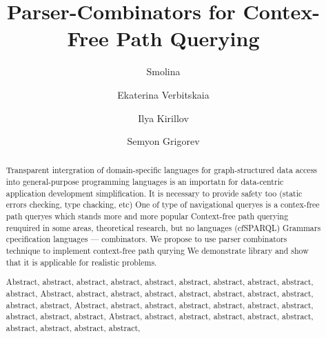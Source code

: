 \documentclass[sigconf]{acmart}
\begin{document}
\title{Parser-Combinators for Contex-Free Path Querying}


\author{Smolina}

\author{Ekaterina Verbitskaia}

\author{Ilya Kirillov}

\author{Semyon Grigorev}

\renewcommand{\shortauthors}{Smolina et al.}

\begin{abstract}
Transparent intergration of domain-specific languages for graph-structured data access into general-purpose programming languages is an importatn for data-centric application development simplification.
It is necessary to provide safety too (static errors checking, type chacking, etc)
One of type of navigational queryes is a contex-free path queryes which stands more and more popular
Context-free path querying reuquired in some areas, theoretical research, but no languages (cfSPARQL)
Grammars cpecification languages --- combinators.
We propose to use parser combinators technique to implement context-free path qurying 
We demonstrate library and show that it is applicable for realistic problems.


Abstract, abstract, abstract, abstract, abstract, abstract, abstract, abstract, abstract, abstract,
Abstract, abstract, abstract, abstract, abstract, abstract, abstract, abstract, abstract, abstract,
Abstract, abstract, abstract, abstract, abstract, abstract, abstract, abstract, abstract, abstract,
Abstract, abstract, abstract, abstract, abstract, abstract, abstract, abstract, abstract, abstract,
\end{abstract}
\end{document}
